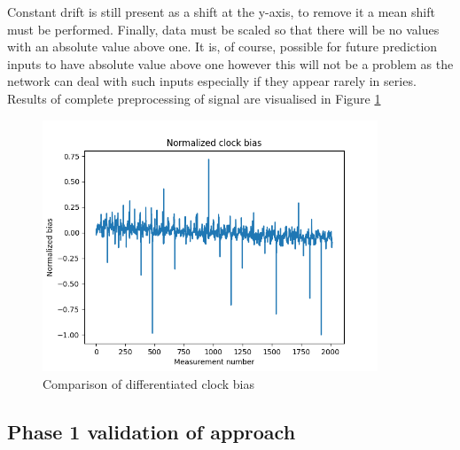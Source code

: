 Constant drift is still present as a shift at the y-axis, to remove it a mean 
shift must be performed.
Finally, data must be scaled so that there will be no values with an absolute value above one.
It is, of course, possible for future prediction inputs to have absolute value above one 
however this will not be a problem as the network can deal with such inputs especially 
if they appear rarely in series.
Results of complete preprocessing of signal are visualised in Figure \ref{fig:bias_normalized}
\begin{figure}[ht] 
	\centering
	\includegraphics[width=10cm]{res/bias_normalized}
	\caption{Comparison of differentiated clock bias}
	\label{fig:bias_normalized}
\end{figure}
\subsection{Phase 1 validation of approach}

